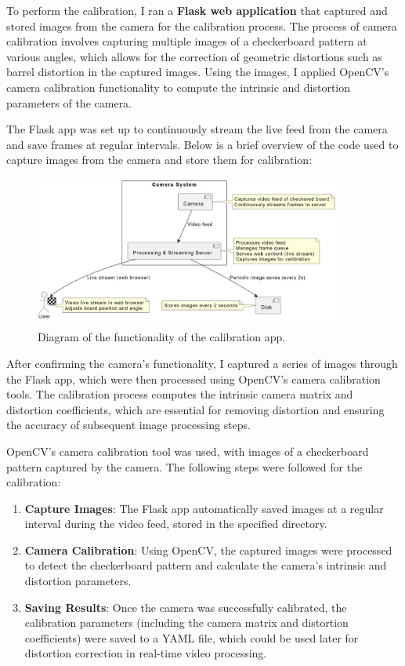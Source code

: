 To perform the calibration, I ran a \textbf{Flask web application} that captured and stored images from the camera for the calibration process. The process of camera calibration involves capturing multiple images of a checkerboard pattern at various angles, which allows for the correction of geometric distortions such as barrel distortion in the captured images. Using the images, I applied OpenCV’s camera calibration functionality to compute the intrinsic and distortion parameters of the camera.

The Flask app was set up to continuously stream the live feed from the camera and save frames at regular intervals. Below is a brief overview of the code used to capture images from the camera and store them for calibration:

\begin{figure}[H]
	\centering
	\includegraphics[width=0.9\textwidth]{ch4/figs/calibration.png}
	\caption{Diagram of the functionality of the calibration app.}
	\label{fig:calibration}
\end{figure}

After confirming the camera’s functionality, I captured a series of images through the Flask app, which were then processed using OpenCV’s camera calibration tools. The calibration process computes the intrinsic camera matrix and distortion coefficients, which are essential for removing distortion and ensuring the accuracy of subsequent image processing steps.

OpenCV's camera calibration tool was used, with images of a checkerboard pattern captured by the camera. The following steps were followed for the calibration:

\begin{enumerate}
	\item \textbf{Capture Images}: The Flask app automatically saved images at a regular interval during the video feed, stored in the specified directory.
	\item \textbf{Camera Calibration}: Using OpenCV, the captured images were processed to detect the checkerboard pattern and calculate the camera’s intrinsic and distortion parameters.
	\item \textbf{Saving Results}: Once the camera was successfully calibrated, the calibration parameters (including the camera matrix and distortion coefficients) were saved to a YAML file, which could be used later for distortion correction in real-time video processing.
\end{enumerate}

